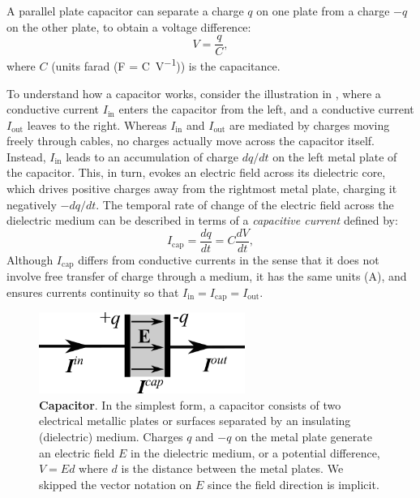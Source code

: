 A parallel plate capacitor can separate a charge $q$ on one plate from a charge $-q$ on the other plate, to obtain a voltage difference:
\begin{equation}
V = \frac{q}{C},
\label{eq:Basics:Vcap}
\end{equation}
where $C$ (units farad (\si{\farad} = \si{\coulomb\per\volt})) is the capacitance.

To understand how a capacitor works, consider the illustration in , where a conductive current $I_\text{in}$ enters the capacitor from the left, and a conductive current $I_\text{out}$ leaves to the right. Whereas $I_\text{in}$ and $I_\text{out}$ are mediated by charges moving freely through cables, no charges actually move across the capacitor itself. Instead, $I_\text{in}$ leads to an accumulation of charge $dq/dt$ on the left metal plate of the capacitor. This, in turn, evokes an electric field across its dielectric core, which drives positive charges away from the rightmost metal plate, charging it negatively $-dq/dt$. The temporal rate of change of the electric field across the dielectric medium can be described in terms of a \textit{capacitive current} defined by:
\begin{equation}
I_\text{cap} = \frac{dq}{dt} = C\frac{dV}{dt},
\label{eq:Basics:Icap}
\end{equation}
Although $I_\text{cap}$ differs from conductive currents in the sense that it does not involve free transfer of charge through a medium, it has the same units (A), and ensures currents continuity so that $I_\text{in} = I_\text{cap} = I_\text{out}$. 

\begin{figure}[!ht]
\begin{center}
\includegraphics[width=0.6\textwidth]{Figures/Basics/Capacitor.png}
\end{center}
\caption{{\bf Capacitor}.  In the simplest form, a capacitor consists of two electrical metallic plates or surfaces separated by an insulating (dielectric) medium. Charges $q$ and $-q$ on the metal plate generate an electric field $E$ in the dielectric medium, or a potential difference, $V = Ed$ where $d$ is the distance between the metal plates. We skipped the vector notation on $E$ since the field direction is implicit.
}
\label{fig:Basics:Capacitor}
\end{figure}

